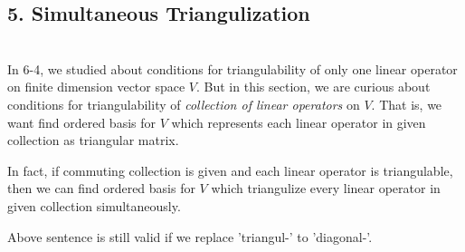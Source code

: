 \subsection*{5. Simultaneous Triangulization}\hfill \\

In 6-4, we studied about conditions for triangulability of only one linear operator on finite dimension vector space $V$.
But in this section, we are curious about conditions for triangulability of \emph{collection of linear operators} on $V$. That is, we want find ordered basis for $V$ which represents each linear operator in given collection as triangular matrix.

In fact, if commuting collection is given and each linear operator is triangulable, then we can find ordered basis for $V$ which triangulize every linear operator in given collection simultaneously.

Above sentence is still valid if we replace 'triangul-' to 'diagonal-'. \\
